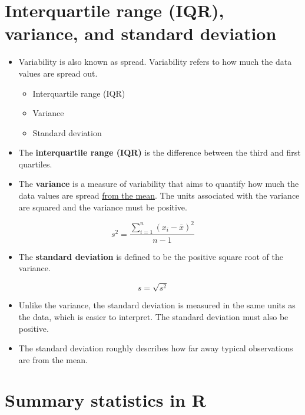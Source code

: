 \documentclass[
  letterpaper,
  DIV=11,
  numbers=noendperiod]{scrreprt}
\providecommand{\tightlist}{%
  \setlength{\itemsep}{0pt}\setlength{\parskip}{0pt}}\usepackage{longtable,booktabs,array}
\begin{document}
\section{Interquartile range (IQR), variance, and standard
deviation}\label{interquartile-range-iqr-variance-and-standard-deviation}

\begin{itemize}
\item
  Variability is also known as spread. Variability refers to how much
  the data values are spread out.

  \begin{itemize}
  \tightlist
  \item
    Interquartile range (IQR)
  \item
    Variance
  \item
    Standard deviation
  \end{itemize}
\item
  The \textbf{interquartile range (IQR)} is the difference between the
  third and first quartiles.
\item
  The \textbf{variance} is a measure of variability that aims to
  quantify how much the data values are spread \ul{from the mean}. The
  units associated with the variance are squared and the variance must
  be positive.
\end{itemize}

\[
  s^2 = \dfrac{\sum_{i = 1}^n (x_i - \bar{x})^2}{n - 1}
\]

\begin{itemize}
\tightlist
\item
  The \textbf{standard deviation} is defined to be the positive square
  root of the variance.
\end{itemize}

\[
s = \sqrt{s^2}
\]

\begin{itemize}
\item
  Unlike the variance, the standard deviation is measured in the same
  units as the data, which is easier to interpret. The standard
  deviation must also be positive.
\item
  The standard deviation roughly describes how far away typical
  observations are from the mean.
\end{itemize}

\section{Summary statistics in R}\label{summary-statistics-in-r}
\end{document}

